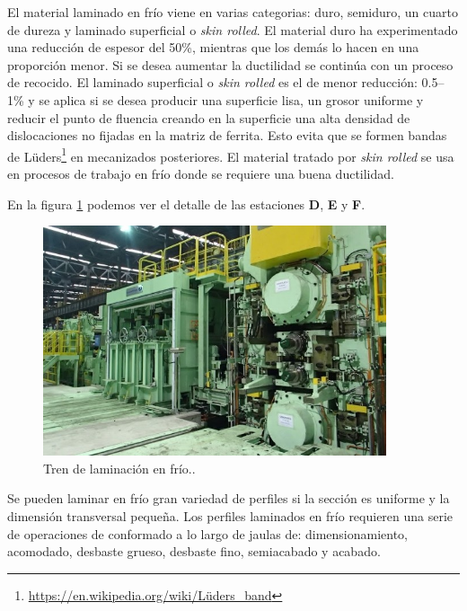El material laminado en frío viene en varias categorias: duro, semiduro, un cuarto de dureza y laminado superficial o \textit{skin rolled}. El material duro ha experimentado una reducción de espesor del 50\%, mientras que los demás lo hacen en una proporción menor. Si se desea aumentar la ductilidad se continúa con un proceso de recocido. El laminado superficial o \textit{skin rolled} es el de menor reducción: 0.5–1\% y se aplica si se desea producir una superficie lisa, un grosor uniforme y reducir el punto de fluencia creando en la superficie una alta densidad de dislocaciones no fijadas en la matriz de ferrita. Esto evita que se formen bandas de Lüders\footnote{\url{https://en.wikipedia.org/wiki/Lüders\_band}} en mecanizados posteriores. El material tratado por \textit{skin rolled} se usa en procesos de trabajo en frío donde se requiere una buena ductilidad.

En la figura \ref{fig:Tren_laminado_frio} podemos ver el detalle de las estaciones \textbf{D}, \textbf{E} y \textbf{F}. 

\begin{figure}[h]
	\centering
	\includegraphics[width=0.90\textwidth]{./Figures/Tren_laminado_frio_SPM_s.jpg}
	\caption{Tren de laminación en frío.\protect\footnotemark.}
	\label{fig:Tren_laminado_frio}
\end{figure}


Se pueden laminar en frío gran variedad de perfiles si la sección es uniforme y la dimensión transversal pequeña. Los perfiles laminados en frío requieren una serie de operaciones de conformado a lo largo de jaulas de: dimensionamiento, acomodado, desbaste grueso, desbaste fino, semiacabado y acabado.

